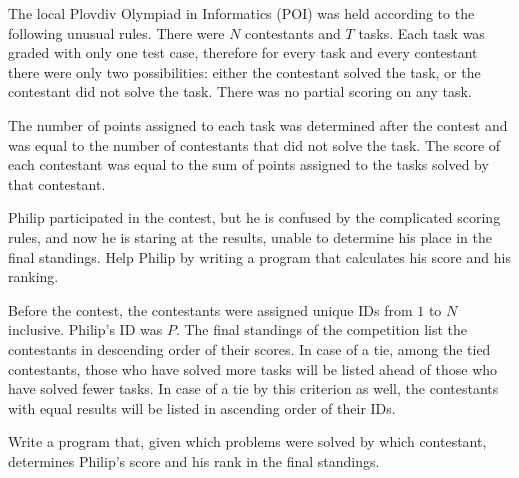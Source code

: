 The local Plovdiv Olympiad in Informatics (POI) was held according to the following unusual rules. There were $N$ contestants and $T$ tasks. Each task was graded with only one test case, therefore for every task and every contestant there were only two possibilities: either the contestant solved the task, or the contestant did not solve the task. There was no partial scoring on any task.

The number of points assigned to each task was determined after the contest and was equal to the number of contestants that did not solve the task. The score of each contestant was equal to the sum of points assigned to the tasks solved by that contestant.

Philip participated in the contest, but he is confused by the complicated scoring rules, and now he is staring at the results, unable to determine his place in the final standings. Help Philip by writing a program that calculates his score and his ranking.

Before the contest, the contestants were assigned unique IDs from $1$ to $N$ inclusive. Philip's ID was $P$. The final standings of the competition list the contestants in descending order of their scores. In case of a tie, among the tied contestants, those who have solved more tasks will be listed ahead of those who have solved fewer tasks. In case of a tie by this criterion as well, the contestants with equal results will be listed in ascending order of their IDs.

Write a program that, given which problems were solved by which contestant, determines
Philip's score and his rank in the final standings.